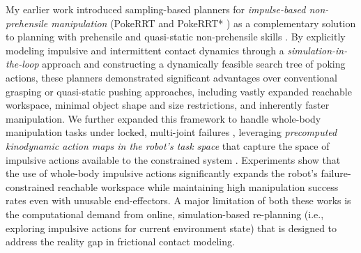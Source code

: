 My earlier work introduced sampling-based planners for \textsl{impulse-based non-prehensile manipulation} (PokeRRT and PokeRRT* \cite{pasricha2022pokerrt}) as a complementary solution to planning with prehensile and quasi-static non-prehensile skills \cite{lynch1999dynamic,zeng2020tossingbot,ruggiero2018nonprehensile,vahrenkamp2010integrated,yu2016more}.
By explicitly modeling impulsive and intermittent contact dynamics through a \textsl{simulation-in-the-loop} approach and constructing a dynamically feasible search tree of poking actions, these planners demonstrated significant advantages over conventional grasping or quasi-static pushing approaches, including vastly expanded reachable workspace, minimal object shape and size restrictions, and inherently faster manipulation.
We further expanded this framework to handle whole-body manipulation tasks under locked, multi-joint failures \cite{lewis1997fault,xie2021maximizing}, leveraging \textsl{precomputed kinodynamic action maps in the robot's task space} that capture the space of impulsive actions available to the constrained system \cite{briscoe2024exploring}.
Experiments show that the use of whole-body impulsive actions significantly expands the robot's failure-constrained reachable workspace while maintaining high manipulation success rates even with unusable end-effectors.
A major limitation of both these works is the computational demand from online, simulation-based re-planning (i.e., exploring impulsive actions for current environment state) that is designed to address the reality gap in frictional contact modeling.